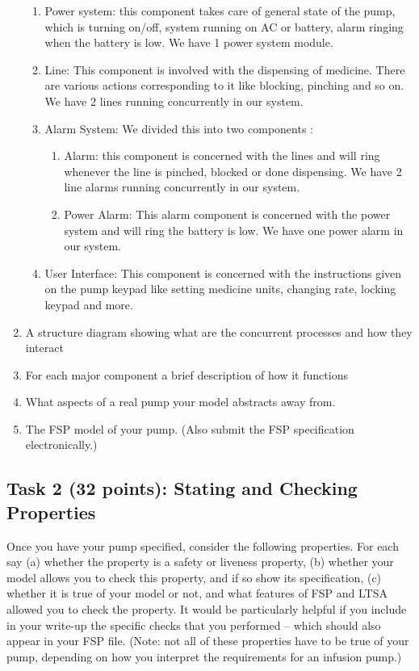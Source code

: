 \documentclass{article}
\newcommand{\head}{\subsection*}
\begin{document}
\begin{enumerate}
  \begin{enumerate}
    \item Power system: this component takes care of general state of the pump, which is turning on/off, system running on AC or battery, alarm ringing when the battery is low. We have 1 power system module.
    \item Line: This component is involved with the dispensing of medicine. There are various actions corresponding to it like blocking, pinching and so on. We have 2 lines running concurrently in our system.
    \item Alarm System: We divided this into two components :
    \begin{enumerate}
      \item Alarm: this component is concerned with the lines and will ring whenever the line is pinched, blocked or done dispensing. We have 2 line alarms running concurrently in our system.
      \item Power Alarm: This alarm component is concerned with the power system and will ring the battery is low. We have one power alarm in our system.
    \end{enumerate}
    \item User Interface: This component is concerned with the instructions given on the pump keypad like setting medicine units, changing rate, locking keypad and more.
  \end{enumerate}

  \item A structure diagram showing what are the concurrent processes and how  they interact

  \bigskip
  
  \item For each major component a brief description of how it functions
  \item What aspects of a real pump your model abstracts away from.
  \item The FSP model of your pump. (Also submit the FSP specification electronically.)
\end{enumerate}

\head{Task 2 (32 points): Stating and Checking Properties}

Once you have your pump specified, consider the following properties. For each say (a) whether the property is a safety or liveness property,  (b) whether your model allows you to check this property, and if
so show its specification, (c) whether it is true of your model or not, and what features of FSP and LTSA allowed you to check the
property. It would be particularly helpful if you include in your write-up the specific checks that you performed -- which should also appear in your FSP file. (Note: not all of these properties have to be true of your pump, depending on how you interpret the requirements for an infusion pump.)
\end{document}

